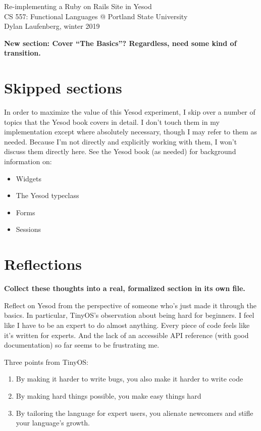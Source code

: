 \documentclass{article}
\newcommand {\todo}[1] {{\textbf{\color{red}#1}}}
\begin{document}
\begin{center}
    \Huge Re-implementing a Ruby on Rails Site in Yesod \\
    \large CS 557: Functional Languages @ Portland State University \\
    Dylan Laufenberg, winter 2019
\end{center}



\todo{New section: Cover ``The Basics''? Regardless, need some kind of transition.}





\section{Skipped sections}

In order to maximize the value of this Yesod experiment, I skip over a number of topics that the Yesod book covers in detail. I don't touch them in my implementation except where absolutely necessary, though I may refer to them as needed. Because I'm not directly and explicitly working with them, I won't discuss them directly here. See the Yesod book (as needed) for background information on:

\begin{itemize}
  \item Widgets
  \item The Yesod typeclass
  \item Forms
  \item Sessions
\end{itemize}

\section{Reflections}

\todo{Collect these thoughts into a real, formalized section in its own file.}

Reflect on Yesod from the perspective of someone who's just made it through the basics. In particular, TinyOS's observation about being hard for beginners. I feel like I have to be an expert to do almost anything. Every piece of code feels like it's written for experts. And the lack of an accessible API reference (with good documentation) so far seems to be frustrating me.

Three points from TinyOS:
\begin{enumerate}
  \item By making it harder to write bugs, you also make it harder to write code
  \item By making hard things possible, you make easy things hard
  \item By tailoring the language for expert users, you alienate newcomers and stifle your language's growth.
\end{enumerate}

% 
% 
% 
% 

\printbibliography
\end{document}
